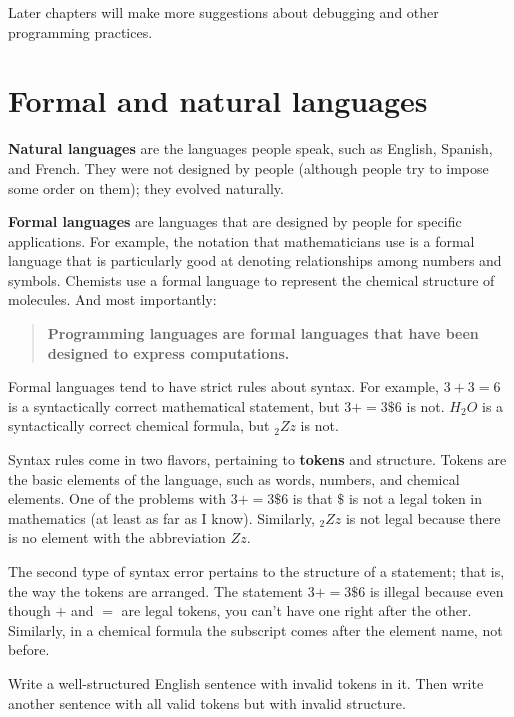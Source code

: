 \documentclass[10pt]{book}
\begin{document}

Later chapters will make more suggestions about debugging and other programming practices.

\section{Formal and natural languages}

{\bf Natural languages} are the languages people speak, such as English, Spanish, and French.  They were not 
designed by people (although people try to impose some order on them); they evolved naturally.

{\bf Formal languages} are languages that are designed by people for specific applications.  For example, the 
notation that mathematicians use is a formal language that is particularly good at denoting relationships 
among numbers and symbols.  Chemists use a formal language to represent the chemical structure of molecules.  
And most importantly:

\begin{quote}
{\bf Programming languages are formal languages that have been designed to express computations.}
\end{quote}

Formal languages tend to have strict rules about syntax.  For example, $3 + 3 = 6$ is a syntactically correct 
mathematical statement, but $3 + = 3 \mbox{\$} 6$ is not.  $H_2O$ is a syntactically correct chemical formula, 
but $_2Zz$ is not.

Syntax rules come in two flavors, pertaining to {\bf tokens} and structure.  Tokens are the basic elements of 
the language, such as words, numbers, and chemical elements.  One of the problems with $3 + = 3 \mbox{\$} 6$ 
is that $\$$ is not a legal token in mathematics (at least as far as I know).  Similarly, $_2Zz$ is not legal 
because there is no element with the abbreviation $Zz$.


The second type of syntax error pertains to the structure of a statement; that is, the way the tokens are 
arranged.  The statement $3 + = 3 \mbox{\$} 6$ is illegal because even though $+$ and $=$ are legal tokens, 
you can't have one right after the other.  Similarly, in a chemical formula the subscript comes after the 
element name, not before.

\begin{ex}
Write a well-structured English sentence with invalid tokens in it.  Then write another sentence with all 
valid tokens but with invalid structure.
\end{ex}
\end{document}
